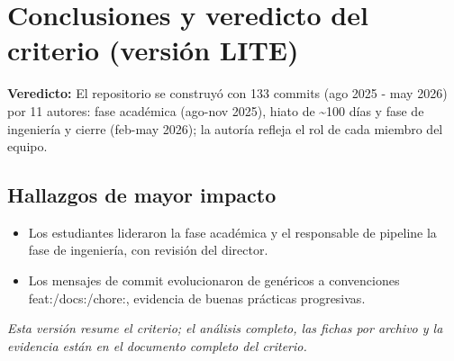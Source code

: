 \section{Conclusiones y veredicto del criterio (versión LITE)}

\begin{tcolorbox}[hallazgo]
\textbf{Veredicto:} El repositorio se construyó con 133 commits (ago 2025 - may 2026) por 11 autores: fase académica (ago-nov 2025), hiato de \textasciitilde{}100 días y fase de ingeniería y cierre (feb-may 2026); la autoría refleja el rol de cada miembro del equipo.

\end{tcolorbox}

\subsection{Hallazgos de mayor impacto}

\begin{itemize}
  \item Los estudiantes lideraron la fase académica y el responsable de pipeline la fase de ingeniería, con revisión del director.
  \item Los mensajes de commit evolucionaron de genéricos a convenciones feat:/docs:/chore:, evidencia de buenas prácticas progresivas.
\end{itemize}

\noindent\textit{Esta versión resume el criterio; el análisis completo, las
fichas por archivo y la evidencia están en el documento completo del criterio.}
